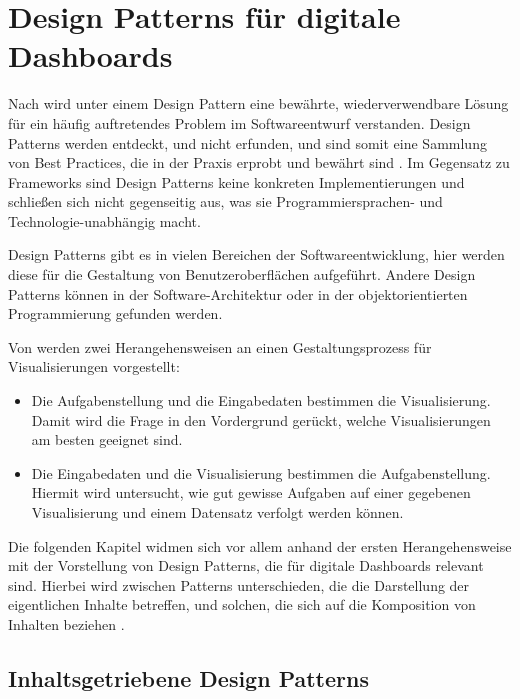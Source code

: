 \section{Design Patterns für digitale Dashboards}\label{sec:design-patterns-list}

Nach \autocite[S. xi]{Gamma.DesignPatterns.1994} wird unter einem Design Pattern eine bewährte, wiederverwendbare Lösung für ein häufig auftretendes Problem im Softwareentwurf verstanden.
Design Patterns werden entdeckt, und nicht erfunden, und sind somit eine Sammlung von Best Practices, die in der Praxis erprobt und bewährt sind \autocite{Few.InformationDashboardDesign.2013}.
Im Gegensatz zu Frameworks sind Design Patterns keine konkreten Implementierungen und schließen sich nicht gegenseitig aus, was sie Programmiersprachen- und Technologie-unabhängig macht.

Design Patterns gibt es in vielen Bereichen der Softwareentwicklung, hier werden diese für die Gestaltung von Benutzeroberflächen aufgeführt.
Andere Design Patterns können in der Software-Architektur oder in der objektorientierten Programmierung\autocite{Gamma.DesignPatterns.1994} gefunden werden.

Von \autocite[S. 2367]{Schulz.DesignSpaceVisualizationTasks.2013} werden zwei Herangehensweisen an einen Gestaltungsprozess für Visualisierungen vorgestellt:

\begin{itemize}
    \item Die Aufgabenstellung und die Eingabedaten bestimmen die Visualisierung.
    Damit wird die Frage in den Vordergrund gerückt, welche Visualisierungen am besten geeignet sind.
    \item Die Eingabedaten und die Visualisierung bestimmen die Aufgabenstellung.
    Hiermit wird untersucht, wie gut gewisse Aufgaben auf einer gegebenen Visualisierung und einem Datensatz verfolgt werden können.
\end{itemize}

Die folgenden Kapitel widmen sich vor allem anhand der ersten Herangehensweise mit der Vorstellung von Design Patterns, die für digitale Dashboards relevant sind.
Hierbei wird zwischen Patterns unterschieden, die die Darstellung der eigentlichen Inhalte betreffen, und solchen, die sich auf die Komposition von Inhalten beziehen \autocite[S. 3--5]{Bach.DashboardDesignPatterns.2023}.


\subsection{Inhaltsgetriebene Design Patterns}\label{subsec:content-design-patterns}

